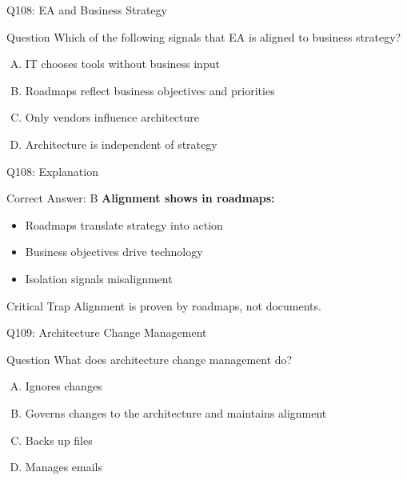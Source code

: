 \documentclass{beamer}
\begin{document}
	\begin{frame}{Q108: EA and Business Strategy}
		\begin{block}{Question}
			Which of the following signals that EA is aligned to business strategy?
		\end{block}
		\begin{enumerate}[(A)]
			\item IT chooses tools without business input
			\item Roadmaps reflect business objectives and priorities
			\item Only vendors influence architecture
			\item Architecture is independent of strategy
		\end{enumerate}
	\end{frame}
	
	\begin{frame}{Q108: Explanation}
		\begin{block}{Correct Answer: B}
			\textbf{Alignment shows in roadmaps:}
			\begin{itemize}
				\item Roadmaps translate strategy into action
				\item Business objectives drive technology
				\item Isolation signals misalignment
			\end{itemize}
		\end{block}
		\begin{alertblock}{Critical Trap}
			Alignment is proven by roadmaps, not documents.
		\end{alertblock}
	\end{frame}
	
	\begin{frame}{Q109: Architecture Change Management}
		\begin{block}{Question}
			What does architecture change management do?
		\end{block}
		\begin{enumerate}[(A)]
			\item Ignores changes
			\item Governs changes to the architecture and maintains alignment
			\item Backs up files
			\item Manages emails
		\end{enumerate}
	\end{frame}
	
\end{document}
